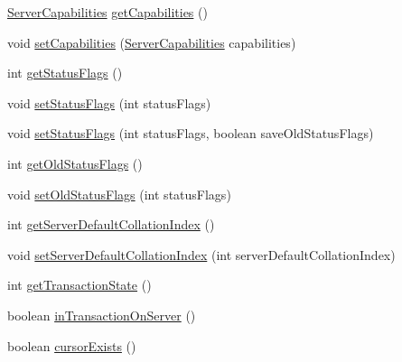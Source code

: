 \begin{DoxyCompactItemize}
\item 
\mbox{\hyperlink{interfacecom_1_1mysql_1_1cj_1_1protocol_1_1_server_capabilities}{Server\+Capabilities}} \mbox{\hyperlink{interfacecom_1_1mysql_1_1cj_1_1protocol_1_1_server_session_a99f2361800e1d3df0a1ab516e4c80737}{get\+Capabilities}} ()
\item 
void \mbox{\hyperlink{interfacecom_1_1mysql_1_1cj_1_1protocol_1_1_server_session_a061f04bcb0fbf1c553fd52639c62b1cc}{set\+Capabilities}} (\mbox{\hyperlink{interfacecom_1_1mysql_1_1cj_1_1protocol_1_1_server_capabilities}{Server\+Capabilities}} capabilities)
\item 
int \mbox{\hyperlink{interfacecom_1_1mysql_1_1cj_1_1protocol_1_1_server_session_a9cba9b511a27892b6e860172734c7d70}{get\+Status\+Flags}} ()
\item 
void \mbox{\hyperlink{interfacecom_1_1mysql_1_1cj_1_1protocol_1_1_server_session_a855cbd715a8c33299d062a72fd75d8f4}{set\+Status\+Flags}} (int status\+Flags)
\item 
void \mbox{\hyperlink{interfacecom_1_1mysql_1_1cj_1_1protocol_1_1_server_session_acf86f0ae9cdfd88f758ec42bb72bf127}{set\+Status\+Flags}} (int status\+Flags, boolean save\+Old\+Status\+Flags)
\item 
int \mbox{\hyperlink{interfacecom_1_1mysql_1_1cj_1_1protocol_1_1_server_session_a71070dd7715b9646cea4a81bd52e5376}{get\+Old\+Status\+Flags}} ()
\item 
void \mbox{\hyperlink{interfacecom_1_1mysql_1_1cj_1_1protocol_1_1_server_session_a8ca3607d493b411a09825465bf202eda}{set\+Old\+Status\+Flags}} (int status\+Flags)
\item 
int \mbox{\hyperlink{interfacecom_1_1mysql_1_1cj_1_1protocol_1_1_server_session_a840bf74b75252459afd6b33ae21c8379}{get\+Server\+Default\+Collation\+Index}} ()
\item 
void \mbox{\hyperlink{interfacecom_1_1mysql_1_1cj_1_1protocol_1_1_server_session_aa712ac71a0771a45a3f8b46ceaac4178}{set\+Server\+Default\+Collation\+Index}} (int server\+Default\+Collation\+Index)
\item 
int \mbox{\hyperlink{interfacecom_1_1mysql_1_1cj_1_1protocol_1_1_server_session_a0af5a6df719817773de40fbc1aba021d}{get\+Transaction\+State}} ()
\item 
boolean \mbox{\hyperlink{interfacecom_1_1mysql_1_1cj_1_1protocol_1_1_server_session_a90f38b18d831d00e5074f12a0a88fad7}{in\+Transaction\+On\+Server}} ()
\item 
boolean \mbox{\hyperlink{interfacecom_1_1mysql_1_1cj_1_1protocol_1_1_server_session_aee37dfcad7c37e0b031da85b7f638435}{cursor\+Exists}} ()

\end{DoxyCompactItemize}
